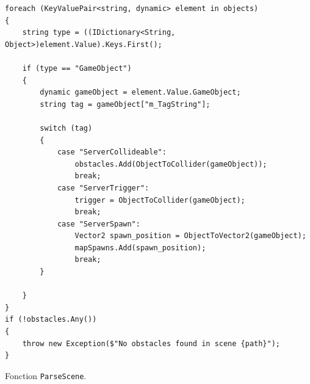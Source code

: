 \documentclass[a4paper]{article}
\begin{document}
\begin{listing}[H]
\begin{verbatim}
foreach (KeyValuePair<string, dynamic> element in objects)
{
    string type = ((IDictionary<String, Object>)element.Value).Keys.First();

    if (type == "GameObject")
    {
        dynamic gameObject = element.Value.GameObject;
        string tag = gameObject["m_TagString"];

        switch (tag)
        {
            case "ServerCollideable":
                obstacles.Add(ObjectToCollider(gameObject));
                break;
            case "ServerTrigger":
                trigger = ObjectToCollider(gameObject);
                break;
            case "ServerSpawn":
                Vector2 spawn_position = ObjectToVector2(gameObject);                            
                mapSpawns.Add(spawn_position);
                break;
        }

    }
}
if (!obstacles.Any())
{
    throw new Exception($"No obstacles found in scene {path}");
}
\end{verbatim}
\caption{Fonction \texttt{ParseScene}.}
\label{extrait:parsescene}
\end{listing}
\end{document}
